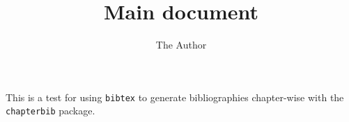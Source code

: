 \documentclass{report}
\begin{document}
\title{Main document}
\author{The Author}
\maketitle

This is a test for using \verb|bibtex| to generate bibliographies
chapter-wise with the \verb|chapterbib| package.


\end{document}
